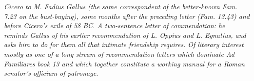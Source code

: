 
\textit{Cicero to M. Fadius Gallus (the same correspondent of
the better-known \textit{Fam.} 7.23 on the bust-buying), some
months after the preceding letter (\textit{Fam.} 13.43) and
before Cicero's exile of 58 BC. A two-sentence letter of
commendation: he reminds Gallus of his earlier recommendation
of L. Oppius and L. Egnatius, and asks him to do for them
all that intimate friendship requires. Of literary interest
mostly as one of a long stream of recommendation letters
which dominate \textit{Ad Familiares} book 13 and which
together constitute a working manual for a Roman senator's
\textit{officium} of patronage.}
